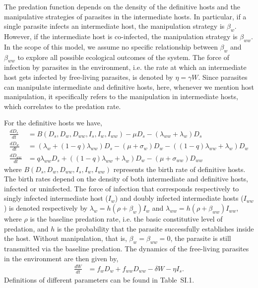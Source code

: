 \documentclass[a4paper]{scrartcl}
\begin{document}
The predation function depends on the density of the definitive hosts and the manipulative strategies of parasites in the intermediate hosts. 
In particular, if a single parasite infects an intermediate host, the manipulation strategy is $\beta_w$. 
However, if the intermediate host is co-infected, the manipulation strategy is $\beta_{ww}$. 
In the scope of this model, we assume no specific relationship between $\beta_w$ and $\beta_{ww}$ to explore all possible ecological outcomes of the system. 
The force of infection by parasites in the environment, i.e. the rate at which an intermediate host gets infected by free-living parasites, is denoted by $\eta = \gamma W$. 
Since parasites can manipulate intermediate and definitive hosts, here, whenever we mention host manipulation, it specifically refers to the manipulation in intermediate hosts, which correlates to the predation rate.

For the definitive hosts we have,
%
\begin{align}
\frac{dD_s}{dt} &= B(D_s,  D_w,  D_{ww},  I_s, I_w, I_{ww})  - \mu D_s - (\lambda_{ww} + \lambda_w) D_s \nonumber \\    
\frac{dD_w}{dt} &= (\lambda_w + (1 - q) \lambda_{ww}) D_s - (\mu + \sigma_w) D_w - ((1 - q) \lambda_{ww} + \lambda_w) D_w  \label{odes:dhosts} \\         
\frac{dD_{ww}}{dt} &= q \lambda_{ww} D_s + ((1 - q) \lambda_{ww} + \lambda_w) D_w - (\mu + \sigma_{ww}) D_{ww} \nonumber
\end{align}
%
where $B(D_s, D_w, D_{ww}, I_s, I_w, I_{ww})$ represents the birth rate of definitive hosts.
The birth rates depend on the density of both intermediate and definitive hosts, infected or uninfected. 
The force of infection that corresponds respectively to singly infected intermediate host ($I_w$) and doubly infected intermediate hosts ($I_{ww}$) is denoted respectively by $\lambda_w = h (\rho + \beta_w)  I_w$ and $\lambda_{ww} = h (\rho + \beta_{ww}) I_{ww}$, where $\rho$ is the baseline predation rate, i.e. the basic constitutive level  of predation, and $h$ is the probability that the parasite successfully establishes inside the host.
Without manipulation, that is, $\beta_w = \beta_{ww} = 0$, the parasite is still transmitted via the baseline predation. 
The dynamics of the free-living parasites in the environment are then given by,
\begin{align}
	\frac{dW}{dt} &= f_w D_w + f_{ww} D_{ww} - \delta W - \eta I_s. \label{odes:eparasite}
\end{align}
%
Definitions of different parameters can be found in Table~SI.1.%
\end{document}
